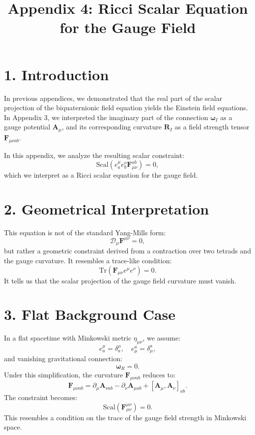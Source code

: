 \documentclass[12pt]{article}
\title{Appendix 4: Ricci Scalar Equation for the Gauge Field}
\author{}
\date{}
\begin{document}
\maketitle

\section*{1. Introduction}

In previous appendices, we demonstrated that the real part of the scalar projection of the biquaternionic field equation yields the Einstein field equations. In Appendix 3, we interpreted the imaginary part of the connection \(\boldsymbol{\omega}_I\) as a gauge potential \(\mathbf{A}_\mu\), and its corresponding curvature \(\mathbf{R}_I\) as a field strength tensor \(\mathbf{F}_{\mu\nu ab}\).

In this appendix, we analyze the resulting scalar constraint:
\[
\text{Scal}(e^\mu_a e^\nu_b \mathbf{F}_{\mu\nu}^{ab}) = 0,
\]
which we interpret as a Ricci scalar equation for the gauge field.

\section*{2. Geometrical Interpretation}

This equation is not of the standard Yang-Mills form:
\[
\mathcal{D}_\mu \mathbf{F}^{\mu\nu} = 0,
\]
but rather a geometric constraint derived from a contraction over two tetrads and the gauge curvature. It resembles a trace-like condition:
\[
\mathrm{Tr}(\mathbf{F}_{\mu\nu} e^\mu e^\nu) = 0.
\]
It tells us that the scalar projection of the gauge field curvature must vanish.

\section*{3. Flat Background Case}

In a flat spacetime with Minkowski metric \( \eta_{\mu\nu} \), we assume:
\[
e^\mu_a = \delta^\mu_a, \quad e^a_\mu = \delta^a_\mu,
\]
and vanishing gravitational connection:
\[
\boldsymbol{\omega}_R = 0.
\]
Under this simplification, the curvature \(\mathbf{F}_{\mu\nu ab}\) reduces to:
\[
\mathbf{F}_{\mu\nu ab} = \partial_\mu \mathbf{A}_{\nu ab} - \partial_\nu \mathbf{A}_{\mu ab} + [\mathbf{A}_{\mu}, \mathbf{A}_{\nu}]_{ab}.
\]
The constraint becomes:
\[
\text{Scal}(\mathbf{F}_{\mu\nu}^{\mu\nu}) = 0.
\]
This resembles a condition on the trace of the gauge field strength in Minkowski space.
\end{document}
